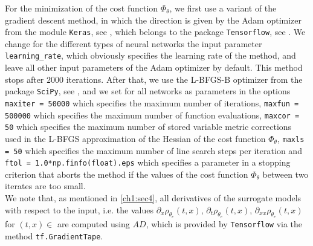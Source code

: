 For the minimization of the cost function $\Phi_{\theta}$, we first use a variant of the gradient descent method, in which the direction is given by the Adam optimizer from the module \lstinline!Keras!, see \cite{Chollet:2015}, which belongs to the package \lstinline!Tensorflow!, see \cite{TensorFlow}. We change for the different types of neural networks the input parameter \lstinline!learning_rate!, which obviously specifies the learning rate of the method, and leave all other input parameters of the Adam optimizer by default. This method stops after $2000$ iterations. After that, we use the L-BFGS-B optimizer from the package \lstinline!SciPy!, see \cite{SciPy:2020}, and we set for all networks as parameters in the options \lstinline!maxiter = 50000! which specifies the maximum number of iterations, \lstinline!maxfun = 500000! which specifies the maximum number of function evaluations, \lstinline!maxcor = 50! which specifies the maximum number of stored variable metric corrections used in the L-BFGS approximation of the Hessian of the cost function $\Phi_{\theta}$, \lstinline!maxls = 50! which specifies the maximum number of line search steps per iteration and \lstinline!ftol = 1.0*np.finfo(float).eps! which specifies a parameter in a stopping criterion that aborts the method if the values of the cost function $\Phi_{\theta}$ between two iterates are too small. \\
We note that, as mentioned in \cref{ch1:sec4}, all derivatives of the surrogate models with respect to the input, i.e. the values $\partial_x \rho_{\theta_e}  \left( t, x \right)$, $\partial_t \rho_{\theta_e}  \left( t, x \right)$, $\partial_{xx} \rho_{\theta_e}  \left( t, x \right)$ for $(t, x) \in $ are computed using $AD$, which is provided by \lstinline!Tensorflow! via the method \lstinline!tf.GradientTape!. \\


\begin{table}[H]\label{tab:one_cost_function}
    \caption{The values of the cost function and the L-error with respect to the values generated by the $FVM$ method of the neural networks defined  after the learning phase. }
\end{table}

